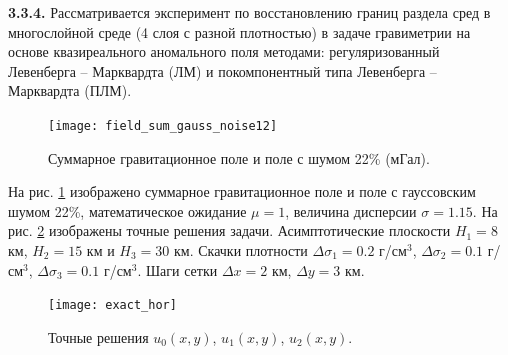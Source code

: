 
{\bfseries 3.3.4.} Рассматривается эксперимент по восстановлению границ раздела сред в многослойной среде (4 слоя с разной плотностью) в задаче гравиметрии на основе квазиреального аномального поля методами: регуляризованный Левенберга -- Марквардта (ЛМ) и покомпонентный типа Левенберга -- Марквардта (ПЛМ).
\begin{figure}
	\centering
	\texttt{[image: field\_sum\_gauss\_noise12]}
	\caption{Суммарное гравитационное поле и поле с шумом 22\% (мГал).}
	\label{fig:field_sum_gauss_noise12}
\end{figure}
На рис. \ref{fig:field_sum_gauss_noise12} изображено суммарное гравитационное поле и поле с гауссовским шумом 22\%, математическое ожидание $\mu=1$, величина дисперсии $\sigma=1.15$. На рис. \ref{fig:exact_hor} изображены точные решения задачи. Асимптотические плоскости $H_1=8$ км, $H_2=15$ км и $H_3=30$ км. Скачки плотности $\Delta\sigma_1=0.2$ г/см$^3$, $\Delta\sigma_2=0.1$ г/см$^3$, $\Delta\sigma_3=0.1$ г/см$^3$. Шаги сетки $\Delta x=2$ км, $\Delta y=3$ км.
\begin{figure}
	\centering
	\texttt{[image: exact\_hor]}
	\caption{Точные решения $u_0(x,y)$, $u_1(x,y)$, $u_2(x,y)$.}
	\label{fig:exact_hor}
\end{figure}

